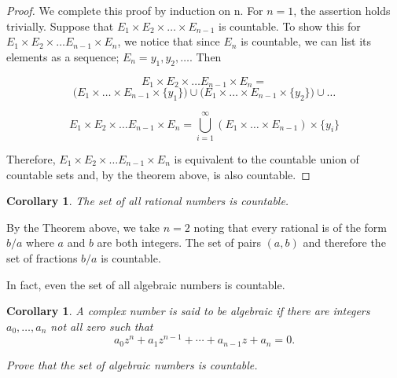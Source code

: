 \documentclass{tufte-book}
\newtheorem{corollary}[theorem]{Corollary}
\theoremstyle{definition}
\numberwithin{section}{chapter}
\begin{document}


\begin{proof}
We complete this proof by induction on n.  For $n=1$, the assertion holds trivially.  Suppose that $E_{1} \times E_{2} \times \ldots \times E_{n-1}$ is countable.  To show this for $E_{1} \times E_{2} \times \ldots E_{n-1}\times E_{n}$, we notice that since $E_{n}$ is countable, we can list its elements as a sequence;  $E_{n}= {y_1, y_2, \ldots}$.  Then

\[E_{1} \times E_{2} \times \ldots E_{n-1}\times E_{n} = \]
\[  \big( E_{1} \times \ldots \times E_{n-1} \times \{y_1\} \big) \cup  \big( E_{1} \times  \ldots \times E_{n-1} \times \{y_2\}\big) \cup  \ldots   \] 

\[E_{1} \times E_{2} \times \ldots E_{n-1}\times E_{n} = \bigcup_{i=1}^{\infty} (E_{1} \times  \ldots \times E_{n-1}) \times \{y_i\}  \] 

Therefore,  $E_{1} \times E_{2} \times \ldots E_{n-1}\times E_{n} $ is equivalent to the countable union of countable sets and, by the theorem above, is also countable.
\end{proof}


\begin{corollary}The set of all rational numbers is countable. \end{corollary}

By the Theorem above, we take $n=2$ noting that every rational is of the form $b/a$ where $a$ and $b$ are both integers.  The set of pairs $(a,b)$ and therefore the set of fractions $b/a$ is countable.  
\medskip

In fact, even the set of all algebraic numbers is countable.

\begin{corollary} 
A complex number is said to be \emph{algebraic} if there are integers $a_{0}, \ldots, a_{n}$ not all zero such that 
$$ a_{0}z^n + a_{1}z^{n-1} + \cdots + a_{n-1}z + a_{n} = 0. $$

Prove that the set of algebraic numbers is countable.
\end{corollary}
 
\end{document}
